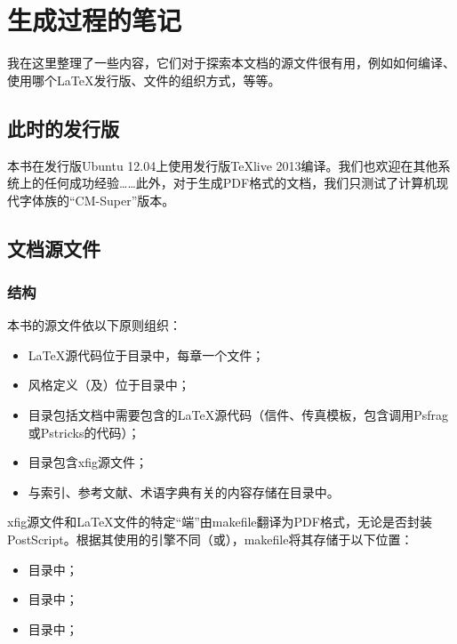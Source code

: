 \chapter{生成过程的笔记}

我在这里整理了一些内容，它们对于探索本文档的源文件很有用，例如如何编译、使用哪个\LaTeX 发行版、文件的组织方式，等等。

\section{此时的发行版}

本书在发行版Ubuntu 12.04上使用发行版\TeX live 2013编译。我们也欢迎在其他系统上的任何成功经验……此外，对于生成PDF格式的文档，我们只测试了计算机现代字体族的“CM-Super”版本。

\section{文档源文件}

\subsection{结构}

本书的源文件依以下原则组织：

\begin{itemize}
    \item \LaTeX 源代码位于目录中，每章一个文件；
    \item 风格定义（及）位于目录中；
    \item 目录包括文档中需要包含的\LaTeX 源代码（信件、传真模板，包含调用Psfrag或Pstricks的代码）；%
    \item 目录包含\textsf{xfig}源文件；
    \item 与索引、参考文献、术语字典有关的内容存储在目录中。
\end{itemize}

\textsf{xfig}源文件和\LaTeX 文件的特定“端”由makefile翻译为PDF格式，无论是否封装PostScript。根据其使用的引擎不同（或），makefile将其存储于以下位置：

\begin{itemize}
    \item 目录中；
    \item 目录中；
    \item 目录中；
\end{itemize}

